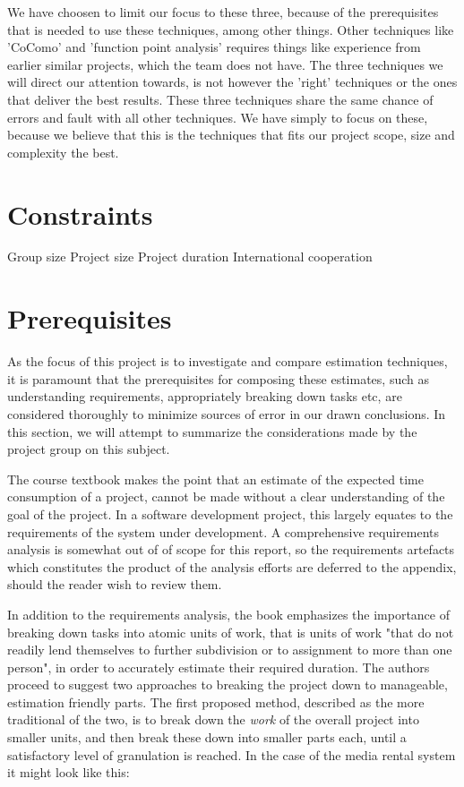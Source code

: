 We have choosen to limit our focus to these three, because of the prerequisites that is needed to use these techniques, among other things. Other techniques like 'CoComo' and 'function point analysis' requires things like experience from earlier similar projects, which the team does not have. The three techniques we will direct our attention towards, is not however the 'right' techniques or the ones that deliver the best results. These three techniques share the same chance of errors and fault with all other techniques. We have simply to focus on these, because we believe that this is the techniques that fits our project scope, size and complexity the best.

\section{Constraints}
Group size
Project size
Project duration
International cooperation
\section{Prerequisites}
As the focus of this project is to investigate and compare estimation techniques, it is paramount that the prerequisites for composing these estimates, such as understanding requirements, appropriately breaking down tasks etc, are considered thoroughly to minimize sources of error in our drawn conclusions. In this section, we will attempt to summarize the considerations made by the project group on this subject.

The course textbook makes the point that an estimate of the expected time consumption of a project, cannot be made without a clear understanding of the goal of the project. In a software development project, this largely equates to the requirements of the system under development. A comprehensive requirements analysis is somewhat out of of scope for this report, so the requirements artefacts which constitutes the product of the analysis efforts are deferred to the appendix, should the reader wish to review them.

In addition to the requirements analysis, the book emphasizes the importance of breaking down tasks into atomic units of work, that is units of work "that do not readily lend themselves to further subdivision or to assignment to more than one person", in order to accurately estimate their required duration. The authors proceed to suggest two approaches to breaking the project down to manageable, estimation friendly parts. The first proposed method, described as the more traditional of the two, is to break down the \textit{work} of the overall project into smaller units, and then break these down into smaller parts each, until a satisfactory level of granulation is reached. In the case of the media rental system it might look like this:

